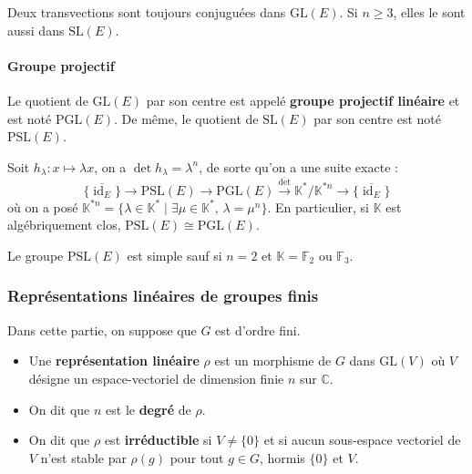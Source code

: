 	\begin{proposition}
		Deux transvections sont toujours conjuguées dans $\mathrm{GL}(E)$. Si $n \geq 3$, elles le sont aussi dans $\mathrm{SL}(E)$.
	\end{proposition}

	\paragraph{Groupe projectif}

	\begin{definition}
		Le quotient de $\mathrm{GL}(E)$ par son centre est appelé \textbf{groupe projectif linéaire} et est noté $\mathrm{PGL}(E)$. De même, le quotient de $\mathrm{SL}(E)$ par son centre est noté $\mathrm{PSL}(E)$.
	\end{definition}

	\begin{remark}
		Soit $h_\lambda : x \mapsto \lambda x$, on a $\det h_\lambda = \lambda^n$, de sorte qu'on a une suite exacte :
		\[ \{ \overline{\operatorname{id}_E} \} \rightarrow \mathrm{PSL}(E) \rightarrow \mathrm{PGL}(E) \xrightarrow{\overline{\det}} \mathbb{K}^*/\mathbb{K}^{*n} \rightarrow \{ \overline{\operatorname{id}_E} \} \]
		où on a posé $\mathbb{K}^{*n} = \{ \lambda \in \mathbb{K}^* \mid \exists \mu \in \mathbb{K}^*, \, \lambda = \mu^n \}$. En particulier, si $\mathbb{K}$ est algébriquement clos, $\mathrm{PSL}(E) \cong \mathrm{PGL}(E)$.
	\end{remark}

	\begin{theorem}
		Le groupe $\mathrm{PSL}(E)$ est simple sauf si $n = 2$ et $\mathbb{K} = \mathbb{F}_2$ ou $\mathbb{F}_3$.
	\end{theorem}

	\subsubsection{Représentations linéaires de groupes finis}


	Dans cette partie, on suppose que $G$ est d'ordre fini.

	\begin{definition}
		\begin{itemize}
			\item Une \textbf{représentation linéaire} $\rho$ est un morphisme de $G$ dans $\mathrm{GL}(V)$ où $V$ désigne un espace-vectoriel de dimension finie $n$ sur $\mathbb{C}$.
			\item On dit que $n$ est le \textbf{degré} de $\rho$.
			\item On dit que $\rho$ est \textbf{irréductible} si $V \neq \{ 0 \}$ et si aucun sous-espace vectoriel de $V$ n'est stable par $\rho(g)$ pour tout $g \in G$, hormis $\{ 0 \}$ et $V$.
		\end{itemize}
	\end{definition}

